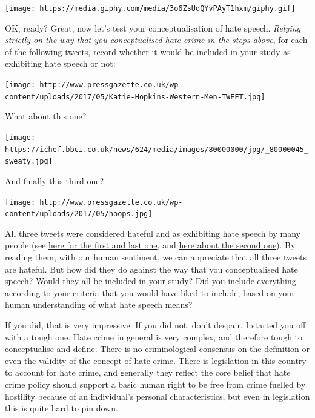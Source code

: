 \documentclass[]{book}
\theoremstyle{definition}
\theoremstyle{definition}
\theoremstyle{definition}
\theoremstyle{remark}
\begin{document}
\texttt{[image: https://media.giphy.com/media/3o6ZsUdQYvPAyT1hxm/giphy.gif]}

OK, ready? Great, now let's test your conceptualisation of hate speech.
\emph{Relying strictly on the way that you conceptualised hate crime in
the steps above}, for each of the following tweets, record whether it
would be included in your study as exhibiting hate speech or not:

\texttt{[image: http://www.pressgazette.co.uk/wp-content/uploads/2017/05/Katie-Hopkins-Western-Men-TWEET.jpg]}

What about this one?

\texttt{[image: https://ichef.bbci.co.uk/news/624/media/images/80000000/jpg/\_80000045\_sweaty.jpg]}

And finally this third one?

\texttt{[image: http://www.pressgazette.co.uk/wp-content/uploads/2017/05/hoops.jpg]}

All three tweets were considered hateful and as exhibiting hate speech
by many people (see
\href{http://www.pressgazette.co.uk/katie-hopkins-leaving-lbc-radio-effective-immediately-station-announces/}{here
for the first and last one}, and
\href{http://www.bbc.co.uk/news/uk-scotland-glasgow-west-30641705}{here
about the second one}). By reading them, with our human sentiment, we
can appreciate that all three tweets are hateful. But how did they do
against the way that you conceptualised hate speech? Would they all be
included in your study? Did you include everything according to your
criteria that you would have liked to include, based on your human
understanding of what hate speech means?

If you did, that is very impressive. If you did not, don't despair, I
started you off with a tough one. Hate crime in general is very complex,
and therefore tough to conceptualise and define. There is no
criminological consensus on the definition or even the validity of the
concept of hate crime. There is legislation in this country to account
for hate crime, and generally they reflect the core belief that hate
crime policy should support a basic human right to be free from crime
fuelled by hostility because of an individual's personal
characteristics, but even in legislation this is quite hard to pin down.
\end{document}
